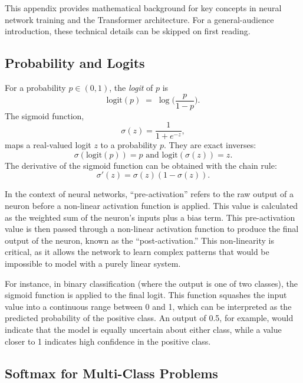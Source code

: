 \documentclass[%
  reprint,
  superscriptaddress,
  showpacs,
  showkeys,
  amsmath,amssymb,
  pra,
  longbibliography,
  floatfix,
  x11names
]{revtex4-2}
\begin{document}
This appendix provides mathematical background for key concepts in neural network training and the Transformer architecture. For a general-audience introduction, these technical details can be skipped on first reading.

\subsection{Probability and Logits}

For a probability $p\in(0,1)$, the \emph{logit} of $p$ is
\begin{equation}
\text{logit}(p) \;=\; \log\!\Big(\frac{p}{1-p}\Big).
\label{eq:logit_def}
\end{equation}
The sigmoid function,
\begin{equation}
\sigma(z)=\frac{1}{1+e^{-z}},
\label{eq:sigmoid_def}
\end{equation}
maps a real-valued logit $z$ to a probability $p$.
They are exact inverses:
\begin{equation}
\sigma(\text{logit}(p)) = p \text{ and }\text{logit}(\sigma(z)) = z.
\label{eq:logit_sigmoid}
\end{equation}
The derivative of the sigmoid function can be obtained with the chain rule:
\begin{equation}
\sigma'(z) = \sigma(z)(1-\sigma(z)).
\label{eq:der_sigmoid}
\end{equation}

In the context of neural networks, ``pre-activation'' refers to the raw output of a neuron before a non-linear activation function is applied. This value is calculated as the weighted sum of the neuron's inputs plus a bias term. This pre-activation value is then passed through a non-linear activation function to produce the final output of the neuron, known as the ``post-activation.'' This non-linearity is critical, as it allows the network to learn complex patterns that would be impossible to model with a purely linear system.

For instance, in binary classification (where the output is one of two classes), the sigmoid function is applied to the final logit. This function squashes the input value into a continuous range between 0 and 1, which can be interpreted as the predicted probability of the positive class. An output of 0.5, for example, would indicate that the model is equally uncertain about either class, while a value closer to 1 indicates high confidence in the positive class.

\subsection{Softmax for Multi-Class Problems}
\end{document}
